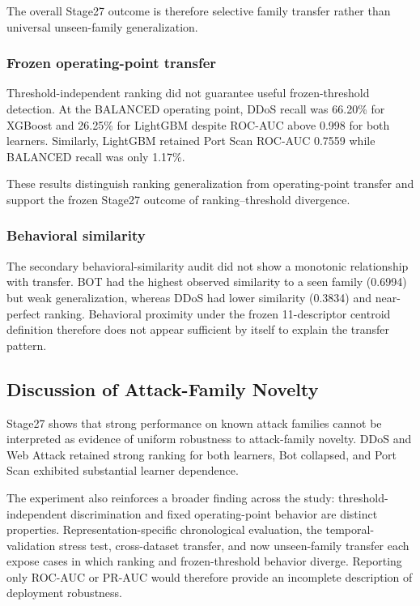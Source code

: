 The overall Stage27 outcome is therefore selective family transfer rather than universal unseen-family generalization.

\subsubsection{Frozen operating-point transfer}

Threshold-independent ranking did not guarantee useful frozen-threshold detection. At the BALANCED operating point, DDoS recall was 66.20\% for XGBoost and 26.25\% for LightGBM despite ROC-AUC above 0.998 for both learners. Similarly, LightGBM retained Port Scan ROC-AUC 0.7559 while BALANCED recall was only 1.17\%.

These results distinguish ranking generalization from operating-point transfer and support the frozen Stage27 outcome of ranking--threshold divergence.

\subsubsection{Behavioral similarity}

The secondary behavioral-similarity audit did not show a monotonic relationship with transfer. BOT had the highest observed similarity to a seen family (0.6994) but weak generalization, whereas DDoS had lower similarity (0.3834) and near-perfect ranking. Behavioral proximity under the frozen 11-descriptor centroid definition therefore does not appear sufficient by itself to explain the transfer pattern.

\subsection{Discussion of Attack-Family Novelty}

Stage27 shows that strong performance on known attack families cannot be interpreted as evidence of uniform robustness to attack-family novelty. DDoS and Web Attack retained strong ranking for both learners, Bot collapsed, and Port Scan exhibited substantial learner dependence.

The experiment also reinforces a broader finding across the study: threshold-independent discrimination and fixed operating-point behavior are distinct properties. Representation-specific chronological evaluation, the temporal-validation stress test, cross-dataset transfer, and now unseen-family transfer each expose cases in which ranking and frozen-threshold behavior diverge. Reporting only ROC-AUC or PR-AUC would therefore provide an incomplete description of deployment robustness.

